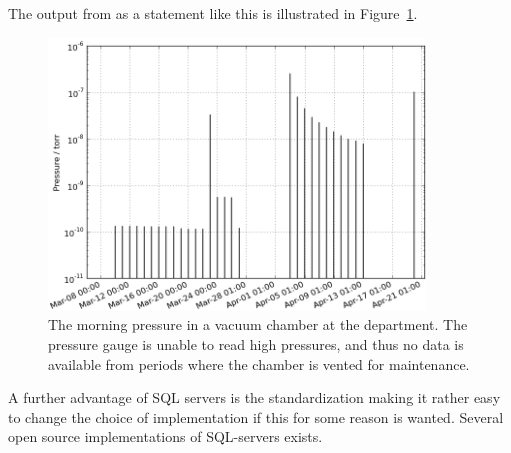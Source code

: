 The output from as a statement like this is illustrated in
Figure~\ref{fig:morning_pressure}.
\begin{figure}
 \begin{center}
 \includegraphics[width=10cm]{morning_pressure.png}
 \caption{ The morning pressure in a vacuum chamber at the department. The
   pressure gauge is unable to read high pressures, and thus no data is
   available from periods where the chamber is vented for maintenance.
   \label{fig:morning_pressure}
 } 
 \end{center}
\end{figure}

A further advantage of SQL servers is the standardization making it rather easy
to change the choice of implementation if this for some reason is wanted.
Several open source implementations of SQL-servers exists.



